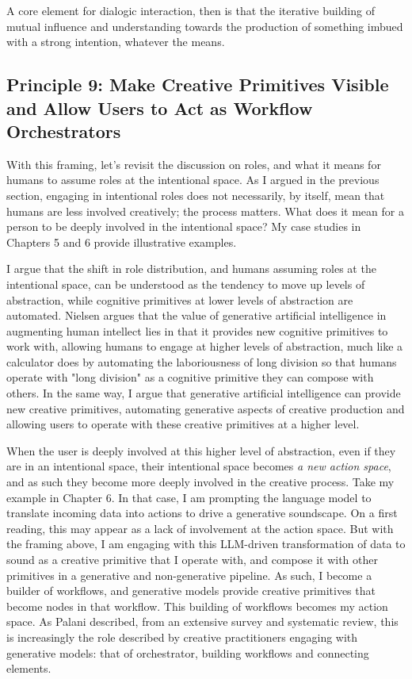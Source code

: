 A core element for dialogic interaction, then is that the iterative building of mutual influence and understanding towards the production of something imbued with a strong intention, whatever the means. 


\subsection{Principle 9: Make Creative Primitives Visible and Allow Users to Act as Workflow Orchestrators}

With this framing, let's revisit the discussion on roles, and what it means for humans to assume roles at the intentional space. As I argued in the previous section, engaging in intentional roles does not necessarily, by itself, mean that humans are less involved creatively; the process matters. What does it mean for a person to be deeply involved in the intentional space? My case studies in Chapters 5 and 6 provide illustrative examples.

I argue that the shift in role distribution, and humans assuming roles at the intentional space, can be understood as the tendency to move up levels of abstraction, while cognitive primitives at lower levels of abstraction are automated. Nielsen argues that the value of generative artificial intelligence in augmenting human intellect lies in that it provides new cognitive primitives to work with, allowing humans to engage at higher levels of abstraction, much like a calculator does by automating the laboriousness of long division so that humans operate with "long division" as a cognitive primitive they can compose with others. In the same way, I argue that generative artificial intelligence can provide new creative primitives, automating generative aspects of creative production and allowing users to operate with these creative primitives at a higher level.

When the user is deeply involved at this higher level of abstraction, even if they are in an intentional space, their intentional space becomes \textit{a new action space}, and as such they become more deeply involved in the creative process. Take my example in Chapter 6. In that case, I am prompting the language model to translate incoming data into actions to drive a generative soundscape. On a first reading, this may appear as a lack of involvement at the action space. But with the framing above, I am engaging with this LLM-driven transformation of data to sound as a creative primitive that I operate with, and compose it with other primitives in a generative and non-generative pipeline. As such, I become a builder of workflows, and generative models provide creative primitives that become nodes in that workflow. This building of workflows becomes my action space. As Palani described, from an extensive survey and systematic review, this is increasingly the role described by creative practitioners engaging with generative models: that of orchestrator, building workflows and connecting elements.

